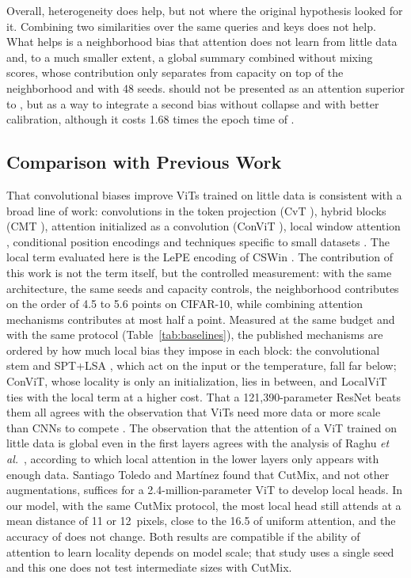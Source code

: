 Overall, heterogeneity does help, but not where the original hypothesis looked for it. Combining two similarities over the same queries and keys does not help. What helps is a neighborhood bias that attention does not learn from little data and, to a much smaller extent, a global summary combined without mixing scores, whose contribution only separates from capacity on top of the neighborhood and with 48 seeds.  should not be presented as an attention superior to , but as a way to integrate a second bias without collapse and with better calibration, although it costs 1.68 times the epoch time of .



\subsection{Comparison with Previous Work}
\label{sec:previos}
That convolutional biases improve ViTs trained on little data is consistent with a broad line of work: convolutions in the token projection (CvT \citep{wu2021cvt}), hybrid blocks (CMT \citep{guo2022cmt}), attention initialized as a convolution (ConViT \citep{dascoli2021convit}), local window attention \citep{liu2021swin}, conditional position encodings \citep{chu2023conditional} and techniques specific to small datasets \citep{lee2021vision}. The local term evaluated here is the LePE encoding of CSWin \citep{dong2022cswin}. The contribution of this work is not the term itself, but the controlled measurement: with the same architecture, the same seeds and capacity controls, the neighborhood contributes on the order of 4.5 to 5.6 points on CIFAR-10, while combining attention mechanisms contributes at most half a point. Measured at the same budget and with the same protocol (Table~\ref{tab:baselines}), the published mechanisms are ordered by how much local bias they impose in each block: the convolutional stem \citep{xiao2021early} and SPT+LSA \citep{lee2021vision}, which act on the input or the temperature, fall far below; ConViT, whose locality is only an initialization, lies in between, and LocalViT \citep{li2021localvit} ties with the local term at a higher cost. That a 121,390-parameter ResNet beats them all agrees with the observation that ViTs need more data or more scale than CNNs to compete \citep{dosovitskiy2021image}. The observation that the attention of a ViT trained on little data is global even in the first layers agrees with the analysis of Raghu \emph{et al.}~\cite{raghu2021vision}, according to which local attention in the lower layers only appears with enough data. Santiago Toledo and Martínez \cite{santiago2026inducing} found that CutMix, and not other augmentations, suffices for a 2.4-million-parameter ViT to develop local heads. In our model, with the same CutMix protocol, the most local head still attends at a mean distance of 11 or 12~pixels, close to the 16.5 of uniform attention, and the accuracy of  does not change. Both results are compatible if the ability of attention to learn locality depends on model scale; that study uses a single seed and this one does not test intermediate sizes with CutMix.

